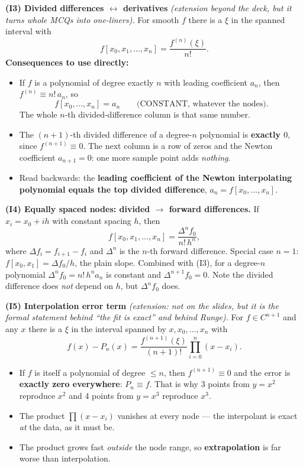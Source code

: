 \begin{derivedbox}
\medskip
\textbf{(I3) Divided differences $\leftrightarrow$ derivatives}
\emph{(extension beyond the deck, but it turns whole MCQs into one-liners).}
For smooth $f$ there is a $\xi$ in the spanned interval with
\[
  f[x_0,x_1,\dots,x_n]=\frac{f^{(n)}(\xi)}{n!} .
\]
\textbf{Consequences to use directly:}
\begin{itemize}
\item If $f$ is a polynomial of degree exactly $n$ with leading coefficient $a_n$, then
      $f^{(n)}\equiv n!\,a_n$, so
      \[
        f[x_0,\dots,x_n]=a_n \qquad\text{(CONSTANT, whatever the nodes).}
      \]
      The whole $n$-th divided-difference column is that same number.
\item The $(n{+}1)$-th divided difference of a degree-$n$ polynomial is
      \textbf{exactly $0$}, since $f^{(n+1)}\equiv0$. The next column is a row of zeros
      and the Newton coefficient $a_{n+1}=0$: one more sample point adds \emph{nothing}.
\item Read backwards: the \textbf{leading coefficient of the Newton interpolating
      polynomial equals the top divided difference}, $a_n=f[x_0,\dots,x_n]$.
\end{itemize}

\medskip
\textbf{(I4) Equally spaced nodes: divided $\to$ forward differences.}
If $x_i=x_0+ih$ with constant spacing $h$, then
\[
  f[x_0,x_1,\dots,x_n]=\frac{\Delta^n f_0}{n!\,h^{n}},
\]
where $\Delta f_i=f_{i+1}-f_i$ and $\Delta^n$ is the $n$-th forward difference.
Special case $n=1$: $f[x_0,x_1]=\Delta f_0/h$, the plain slope.
Combined with (I3), for a degree-$n$ polynomial $\Delta^n f_0=n!\,h^{n}a_n$ is constant
and $\Delta^{n+1}f_0=0$. Note the divided difference does \emph{not} depend on $h$, but
$\Delta^n f_0$ does.

\medskip
\textbf{(I5) Interpolation error term} \emph{(extension: not on the slides, but it is the
formal statement behind ``the fit is exact'' and behind Runge).} For $f\in C^{n+1}$ and
any $x$ there is a $\xi$ in the interval spanned by $x,x_0,\dots,x_n$ with
\[
  f(x)-P_n(x)=\frac{f^{(n+1)}(\xi)}{(n+1)!}\prod_{i=0}^{n}(x-x_i).
\]
\begin{itemize}
\item If $f$ is itself a polynomial of degree $\le n$, then $f^{(n+1)}\equiv0$ and the
      error is \textbf{exactly zero everywhere}: $P_n\equiv f$. That is why 3 points from
      $y=x^2$ reproduce $x^2$ and 4 points from $y=x^3$ reproduce $x^3$.
\item The product $\prod(x-x_i)$ vanishes at every node --- the interpolant is exact
      \emph{at} the data, as it must be.
\item The product grows fast \emph{outside} the node range, so \textbf{extrapolation} is
      far worse than interpolation.
\end{itemize}


\end{derivedbox}
